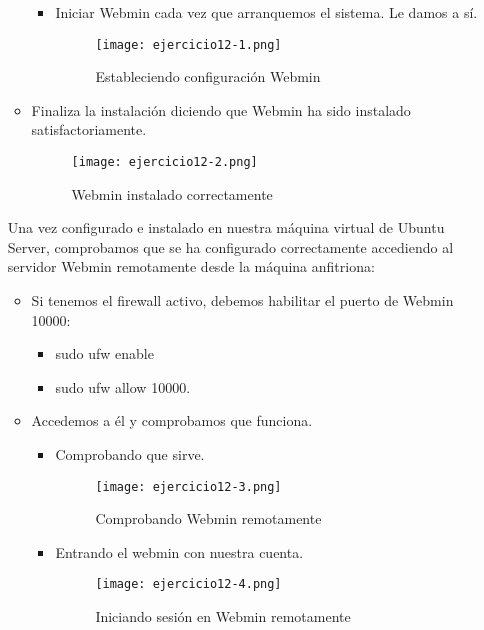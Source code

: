 \begin{itemize}
\begin{itemize}
\begin{itemize}
				\item Iniciar Webmin cada vez que arranquemos el sistema. Le damos a sí.
				\begin{figure}[H]	
					\centering
					\texttt{[image: ejercicio12-1.png]} 
					\label{figura87} 
					\caption{Estableciendo configuración Webmin}
				\end{figure} 
			\end{itemize}
			\item Finaliza la instalación diciendo que Webmin ha sido instalado satisfactoriamente.
			\begin{figure}[H]	
				\centering
				\texttt{[image: ejercicio12-2.png]} 
				\label{figura88} 
				\caption{Webmin instalado correctamente}
			\end{figure} 
		\end{itemize}
	
	Una vez configurado e instalado en nuestra máquina virtual de Ubuntu Server, comprobamos que se ha configurado correctamente accediendo al servidor Webmin remotamente desde la máquina anfitriona:
	
	\begin{itemize}
		\item Si tenemos el firewall activo, debemos habilitar el puerto de Webmin 10000:
			\begin{itemize}
				\item sudo ufw enable
				\item sudo ufw allow 10000.
			\end{itemize}
		\item Accedemos a él y comprobamos que funciona.
			\begin{itemize}
				\item Comprobando que sirve.
					\begin{figure}[H]	
						\centering
						\texttt{[image: ejercicio12-3.png]} 
						\label{figura89} 
						\caption{Comprobando Webmin remotamente}
					\end{figure} 
				\item Entrando el webmin con nuestra cuenta.
					\begin{figure}[H]	
						\centering
						\texttt{[image: ejercicio12-4.png]} 
						\label{figura90} 
						\caption{Iniciando sesión en Webmin remotamente}
					\end{figure} 
			\end{itemize}
			
	\end{itemize}
		
	\end{itemize}
